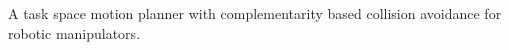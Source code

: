 A task space motion planner with complementarity based collision avoidance for robotic manipulators.

 